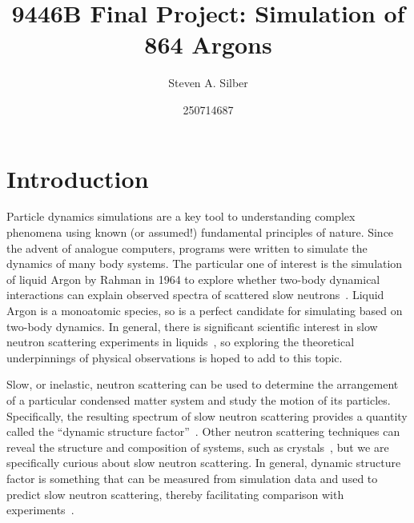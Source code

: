 \documentclass[12pt]{article}
\begin{document}
\title{9446B Final Project: Simulation of 864 Argons}


\author{Steven A. Silber\and 250714687}


\maketitle


\section{Introduction}
\label{}

Particle dynamics simulations are a key tool to understanding complex phenomena using known (or assumed!) fundamental principles of nature. Since the advent of analogue computers, programs were written to simulate the dynamics of many body systems. The particular one of interest is the simulation of liquid Argon by Rahman in 1964 to explore whether two-body dynamical interactions can explain observed spectra of scattered slow neutrons~\cite{Rahman1964}. Liquid Argon is a monoatomic species, so is a perfect candidate for simulating based on two-body dynamics. In general, there is significant scientific interest in slow neutron scattering experiments in liquids~\cite{Rahman1962}, so exploring the theoretical underpinnings of physical observations is hoped to add to this topic.

Slow, or inelastic, neutron scattering can be used to determine the arrangement of a particular condensed matter system and study the motion of its particles. Specifically, the resulting spectrum of slow neutron scattering provides a quantity called the ``dynamic structure factor''~\cite{Squires1996Book}. Other neutron scattering techniques can reveal the structure and composition of systems, such as crystals~\cite{Feigin2013}, but we are specifically curious about slow neutron scattering. In general, dynamic structure factor is something that can be measured from simulation data and used to predict slow neutron scattering, thereby facilitating comparison with experiments~\cite{Nijboer1966}. 
\end{document}
